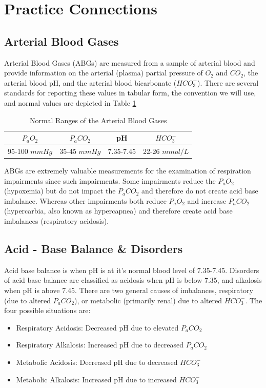 \section{Practice Connections}

\subsection{Arterial Blood Gases}

Arterial Blood Gases (ABGs) are measured from a sample of arterial blood and provide information on the arterial (plasma) partial pressure of $O_2$ and $CO_2$, the arterial blood pH, and the arterial blood bicarbonate ($HCO_3^-$). There are several standards for reporting these values in tabular form, the convention we will use, and normal values are depicted in Table \ref{table:ABGs}

\begin{table}[h!]
\centering
\begin{tabular}{||c|c|c|c||} 
 \hline
 $P_aO_2$ & $P_aCO_2$ & pH & $HCO_3^-$ \\ [0.5ex] 
 \hline
 95-100 $mmHg$ & 35-45 $mmHg$ & 7.35-7.45 & 22-26 $mmol/L$ \\ [1ex] 
 \hline
\end{tabular}
\caption{Normal Ranges of the Arterial Blood Gases}
\label{table:ABGs}
\end{table}

ABGs are extremely valuable measurements for the examination of respiration impairments since such impairments. Some impairments reduce the $P_aO_2$ (hypoxemia) but do not impact the $P_aCO_2$ and therefore do not create acid base imbalance. Whereas other impairments both reduce $P_aO_2$ and increase $P_aCO_2$ (hypercarbia, also known as hypercapnea) and therefore create acid base imbalances (respiratory acidosis).

\subsection{Acid - Base Balance \& Disorders}

Acid base balance is when pH is at it's normal blood level of 7.35-7.45. Disorders of acid base balance are classified as acidosis when pH is below 7.35, and alkalosis when pH is above 7.45. There are two general causes of imbalances, respiratory (due to altered $P_aCO_2$), or metabolic (primarily renal) due to altered $HCO_3^-$. The four possible situations are:
\vspace{3mm}
\begin{itemize}
    \item Respiratory Acidosis: Decreased pH due to elevated $P_aCO_2$
    \item Respiratory Alkalosis: Increased pH due to decreased $P_aCO_2$
    \item Metabolic Acidosis: Decreased pH due to decreased $HCO_3^-$
    \item Metabolic Alkalosis: Increased pH due to increased $HCO_3^-$
\end{itemize}
\vspace{3mm}

